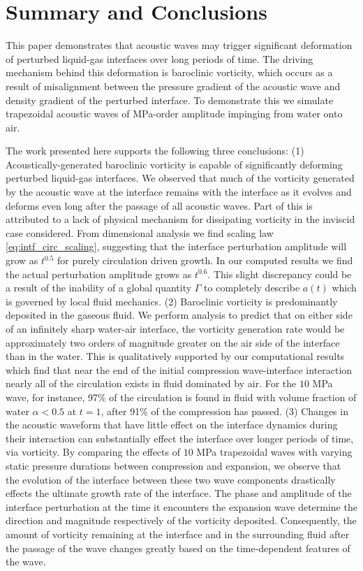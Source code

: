 \section{Summary and Conclusions}
\label{sec:conclusions}
This paper demonstrates that acoustic waves may trigger significant
deformation of perturbed liquid-gas interfaces over long periods of
time. The driving mechanism behind this deformation is baroclinic
vorticity, which occurs as a result of misalignment between the
pressure gradient of the acoustic wave and density gradient of the
perturbed interface. To demonstrate this we simulate trapezoidal
acoustic waves of MPa-order amplitude impinging from water onto
air.

The work presented here supports the following three conclusions: (1)
Acoustically-generated baroclinic vorticity is capable of
significantly deforming perturbed liquid-gas interfaces. We observed
that much of the vorticity generated by the acoustic wave at the
interface remains with the interface as it evolves and deforms even
long after the passage of all acoustic waves. Part of this is
attributed to a lack of physical mechanism for dissipating vorticity
in the inviscid case considered. From dimensional analysis we find
scaling law \eqref{eq:intf_circ_scaling}, suggesting that the
interface perturbation amplitude will grow as $t^{0.5}$ for purely
circulation driven growth. In our computed results we find the actual
perturbation amplitude grows as $t^{0.6}$. This slight discrepancy
could be a result of the inability of a global quantity $\Gamma$ to
completely describe $a(t)$ which is governed by local fluid mechanics.
%
(2) Baroclinic vorticity is predominantly deposited in the gaseous
fluid. We perform analysis to predict that on either side of an
infinitely sharp water-air interface, the vorticity generation rate
would be approximately two orders of magnitude greater on the air side
of the interface than in the water. This is qualitatively supported by
our computational results which find that near the end of the initial
compression wave-interface interaction nearly all of the circulation
exists in fluid dominated by air. For the $10$ MPa wave, for instance,
97\% of the circulation is found in fluid with volume fraction of
water $\alpha<0.5$ at $t=1$, after 91\% of the compression has passed.
%
(3) Changes in the acoustic waveform that have little effect on the
interface dynamics during their interaction can substantially effect
the interface over longer periods of time, via vorticity. By comparing
the effects of $10$ MPa trapezoidal waves with varying static pressure
durations between compression and expansion, we observe that the
evolution of the interface between these two wave components
drastically effects the ultimate growth rate of the interface. The
phase and amplitude of the interface perturbation at the time it
encounters the expansion wave determine the direction and magnitude
respectively of the vorticity deposited. Consequently, the amount of
vorticity remaining at the interface and in the surrounding fluid
after the passage of the wave changes greatly based on the
time-dependent features of the wave.

